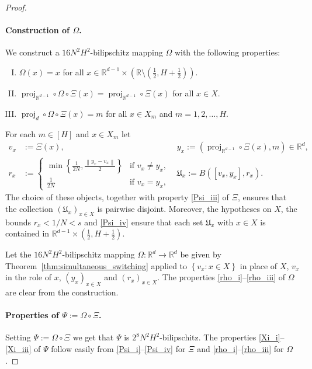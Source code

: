 \documentclass[10pt,a4paper]{amsart}
\DeclareMathOperator{\proj}{proj}
\newcommand{\R}{\mathbb{R}}
\newcommand{\br}[1]{\left(#1\right)}
\newcommand{\enorm}[1]{\left\|#1\right\|}
\newcommand{\mf}[1]{\mathfrak{#1}}
\newcommand{\set}[1]{\left\{#1\right\}}
\begin{document}
\begin{proof}
	\paragraph{Construction of $\Omega$.} 
	We construct a $16N^{2}H^{2}$-bilipschitz mapping $\Omega$ with the following properties:
	\begin{enumerate}[(I)]
		\item\label{rho_i} $\Omega(x)=x$ for all $x\in\R^{d-1}\times \br{\R\setminus \br{\frac{1}{2},H+\frac{1}{2}}}$.
		\item\label{rho_ii} $\proj_{\R^{d-1}}\circ \Omega\circ \Xi(x)=\proj_{\R^{d-1}}\circ \Xi(x)$ for all $x\in X$.
		\item\label{rho_iii} $\proj_{d}\circ \Omega\circ \Xi(x)=m$ for all $x\in X_{m}$ and $m=1,2,\ldots,H$.
	\end{enumerate}
	For each $m\in [H]$ and $x\in X_{m}$ let 
	\begin{align*}
	v_{x}&:=\Xi(x), & y_{x}:=(\proj_{\R^{d-1}}\circ \Xi(x),m)\in \R^{d},\\
	r_{x}&:=\begin{cases}
	\min\set{\frac{1}{2N},\frac{\enorm{y_{x}-v_{x}}}{2}} & \text{if }v_x\neq y_x,\\
	\frac{1}{2N} & \text{if }v_x=y_x,
	\end{cases} & \mf{U}_{x}:=B([v_{x},y_{x}], r_{x}).
	\end{align*}
	The choice of these objects, together with property \eqref{Psi_iii} of $\Xi$, ensures that the collection $(\mf{U}_{x})_{x\in X}$ is pairwise disjoint. Moreover, the hypotheses on $X$, the bounds $r_{x}<1/N<s$ and \eqref{Psi_iv} ensure that each set $\mf{U}_{x}$ with $x\in X$ is contained in $\R^{d-1}\times \br{\frac{1}{2},H+\frac{1}{2}}$. 
	
	
	Let the $16N^{2}H^{2}$-bilipschitz mapping $\Omega\colon \R^{d}\to \R^{d}$ be given by Theorem~\ref{thm:simultaneous_switching} applied to $\set{v_{x}\colon x\in X}$ in place of $X$, $v_{x}$ in the role of $x$, $(y_{x})_{x\in X}$ and $(r_{x})_{x\in X}$. The properties \eqref{rho_i}--\eqref{rho_iii} of $\Omega$ are clear from the construction. 
	\paragraph{Properties of $\Psi:=\Omega\circ \Xi$.}
	Setting $\Psi:=\Omega\circ \Xi$ we get that $\Psi$ is $2^{8}N^{2}H^{2}$-bilipschitz. The properties \eqref{Xi_i}--\eqref{Xi_iii} of $\Psi$ follow easily from \eqref{Psi_i}--\eqref{Psi_iv} for $\Xi$ and \eqref{rho_i}--\eqref{rho_iii} for $\Omega$.
\end{proof}
\end{document}
